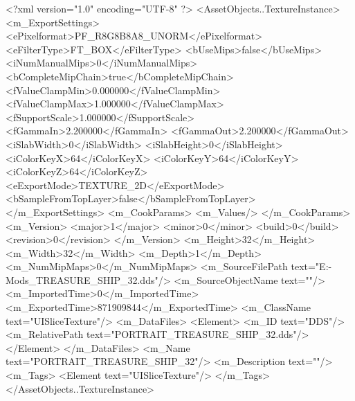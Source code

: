 <?xml version="1.0" encoding="UTF-8" ?>
<AssetObjects..TextureInstance>
	<m_ExportSettings>
		<ePixelformat>PF_R8G8B8A8_UNORM</ePixelformat>
		<eFilterType>FT_BOX</eFilterType>
		<bUseMips>false</bUseMips>
		<iNumManualMips>0</iNumManualMips>
		<bCompleteMipChain>true</bCompleteMipChain>
		<fValueClampMin>0.000000</fValueClampMin>
		<fValueClampMax>1.000000</fValueClampMax>
		<fSupportScale>1.000000</fSupportScale>
		<fGammaIn>2.200000</fGammaIn>
		<fGammaOut>2.200000</fGammaOut>
		<iSlabWidth>0</iSlabWidth>
		<iSlabHeight>0</iSlabHeight>
		<iColorKeyX>64</iColorKeyX>
		<iColorKeyY>64</iColorKeyY>
		<iColorKeyZ>64</iColorKeyZ>
		<eExportMode>TEXTURE_2D</eExportMode>
		<bSampleFromTopLayer>false</bSampleFromTopLayer>
	</m_ExportSettings>
	<m_CookParams>
		<m_Values/>
	</m_CookParams>
	<m_Version>
		<major>1</major>
		<minor>0</minor>
		<build>0</build>
		<revision>0</revision>
	</m_Version>
	<m_Height>32</m_Height>
	<m_Width>32</m_Width>
	<m_Depth>1</m_Depth>
	<m_NumMipMaps>0</m_NumMipMaps>
	<m_SourceFilePath text="E:\Games{}-Mods\Leaders\ZHUDI\pictrues\PORTRAIT_TREASURE_SHIP_32.dds"/>
	<m_SourceObjectName text=""/>
	<m_ImportedTime>0</m_ImportedTime>
	<m_ExportedTime>871909844</m_ExportedTime>
	<m_ClassName text="UISliceTexture"/>
	<m_DataFiles>
		<Element>
			<m_ID text="DDS"/>
			<m_RelativePath text="PORTRAIT_TREASURE_SHIP_32.dds"/>
		</Element>
	</m_DataFiles>
	<m_Name text="PORTRAIT_TREASURE_SHIP_32"/>
	<m_Description text=""/>
	<m_Tags>
		<Element text="UISliceTexture"/>
	</m_Tags>
</AssetObjects..TextureInstance>

